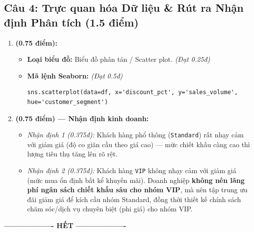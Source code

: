 \documentclass[11pt,a4paper]{article}
\begin{document}
\subsection*{Câu 4: Trực quan hóa Dữ liệu \& Rút ra Nhận định Phân tích (1.5 điểm)}
\begin{enumerate}[label=\textbf{\alph*)}]
  \item \textbf{(0.75 điểm):}
  \begin{itemize}
    \item \textbf{Loại biểu đồ:} Biểu đồ phân tán / Scatter plot. \textit{(Đạt 0.25đ)}
    \item \textbf{Mã lệnh Seaborn:} \textit{(Đạt 0.5đ)}
\begin{lstlisting}
sns.scatterplot(data=df, x='discount_pct', y='sales_volume', hue='customer_segment')
\end{lstlisting}
  \end{itemize}

  \item \textbf{(0.75 điểm) --- Nhận định kinh doanh:}
  \begin{itemize}
    \item \textit{Nhận định 1 (0.375đ):} Khách hàng phổ thông (\texttt{Standard}) rất nhạy cảm với giảm giá (độ co giãn cầu theo giá cao) --- mức chiết khấu càng cao thì lượng tiêu thụ tăng lên rõ rệt.
    \item \textit{Nhận định 2 (0.375đ):} Khách hàng \texttt{VIP} không nhạy cảm với giảm giá (mức mua ổn định bất kể khuyến mãi). Doanh nghiệp \textbf{không nên lãng phí ngân sách chiết khấu sâu cho nhóm VIP}, mà nên tập trung ưu đãi giảm giá để kích cầu nhóm Standard, đồng thời thiết kế chính sách chăm sóc/dịch vụ chuyên biệt (phi giá) cho nhóm VIP.
  \end{itemize}
\end{enumerate}

\begin{center}
\textbf{------------------- HẾT -------------------}
\end{center}
\end{document}
